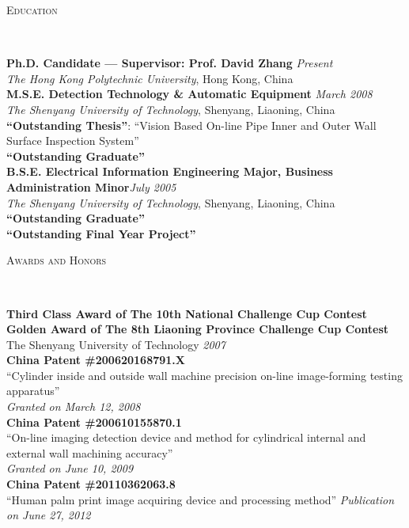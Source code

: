 \documentclass[9pt]{article}
\newenvironment{changemargin}[2]{%
  \begin{list}{}{%
    \setlength{\topsep}{0pt}%
    \setlength{\leftmargin}{#1}%
    \setlength{\rightmargin}{#2}%
    \setlength{\listparindent}{\parindent}%
    \setlength{\itemindent}{\parindent}%
    \setlength{\parsep}{\parskip}%
  }%
  \item[]}{\end{list}
}
\newcommand{\lineover}{
	\begin{changemargin}{-0.05in}{-0.05in}
		\vspace*{-8pt}
		\hrulefill \\
		\vspace*{-2pt}
	\end{changemargin}
}
\newcommand{\header}[1]{
	\begin{changemargin}{-0.5in}{-0.5in}
		\scshape{#1}\\
  	\lineover
	\end{changemargin}
}
\newenvironment{body} {
	\vspace*{-16pt}
	\begin{changemargin}{-0.25in}{-0.5in}
  }	
	{\end{changemargin}
}
\begin{document}
\medskip


\header{Education}

\begin{body}
	\vspace{14pt}
	\textbf{Ph.D. Candidate --- Supervisor: Prof. David Zhang}{} \hfill \emph{Present}{} \\
	\emph{The Hong Kong Polytechnic University}, Hong Kong, China{} \\
  \medskip
	\textbf{M.S.E. Detection Technology \& Automatic Equipment}{} \hfill \emph{March 2008}{} \\
	\emph{The Shenyang University of Technology}, Shenyang, Liaoning, China{} \\
	\textbf{``Outstanding Thesis''}: ``Vision Based On-line Pipe Inner and Outer Wall Surface Inspection System''\\
    \textbf{``Outstanding Graduate''}\\
  \medskip
	\textbf{B.S.E. Electrical Information Engineering Major, Business Administration Minor}\hfill \emph{July 2005} \\
    \emph{The Shenyang University of Technology}, Shenyang, Liaoning, China{} \\
    \textbf{``Outstanding Graduate''}\\
    \textbf{``Outstanding Final Year Project''}\\
\end{body}

\medskip


\header{Awards and Honors}

\begin{body}
	\vspace{14pt}	
    \textbf{Third Class Award of The 10th National Challenge Cup Contest\\
    Golden Award of The 8th Liaoning Province Challenge Cup Contest}\\
    The Shenyang University of Technology \hfill{} \emph{2007}\\
    \medskip
    \textbf{China Patent \#200620168791.X}\\
    ``Cylinder inside and outside wall machine precision on-line image-forming testing apparatus''\\
    \hfill{} \emph{Granted on March 12, 2008}\\
    \medskip	
    \textbf{China Patent \#200610155870.1}\\
    ``On-line imaging detection device and method for cylindrical internal and external wall machining accuracy''\\
    \hfill{} \emph{Granted on June 10, 2009}\\
    \medskip    
    \textbf{China Patent \#20110362063.8}\\
    ``Human palm print image acquiring device and processing method'' \hfill{} \emph{Publication on June 27, 2012}
\end{body}
\end{document}
